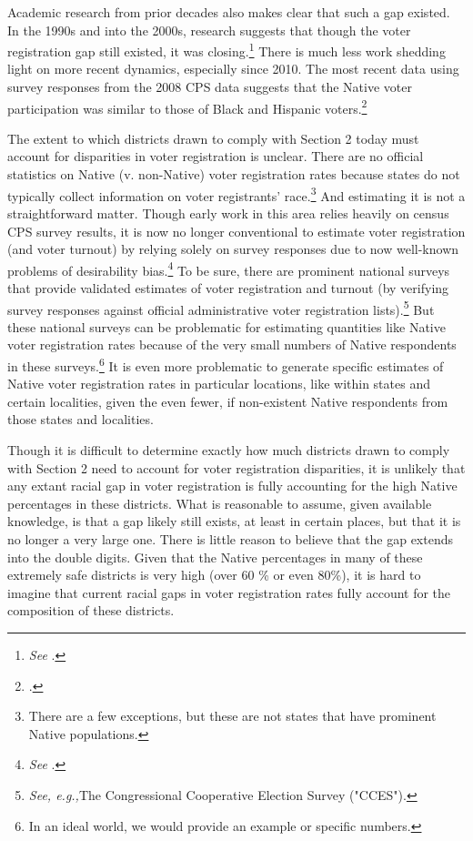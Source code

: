 \documentclass[12pt]{article}
\begin{document}
Academic research from prior decades also makes clear that such a gap existed.  In the 1990s and into the 2000s, research suggests that though the voter registration gap still existed, it was closing.\footnote{\textit{See} \cite{peterson_1997, peterson_1999, stubben_2006, mccool2007native, wang_2012}.}  There is much less work shedding light on more recent dynamics, especially since 2010. The most recent data using survey responses from the 2008 CPS data suggests that the Native voter participation was similar to those of Black and Hispanic voters.\footnote{\cite{huyser_sanchez_vargas_2017}.}

The extent to which districts drawn to comply with Section 2 today must account for disparities in voter registration is unclear. There are no official statistics on Native (v. non-Native) voter registration rates because states do not typically collect information on voter registrants' race.\footnote{There are a few exceptions, but these are not states that have prominent Native populations.} And estimating it is not a straightforward matter. Though early work in this area relies heavily on census CPS survey results, it is now no longer conventional to estimate voter registration (and voter turnout) by relying solely on survey responses due to now well-known problems of desirability bias.\footnote{\textit{See} \cite{ansolabehere_hersh_2012}.} To be sure, there are prominent national surveys that provide validated estimates of voter registration and turnout (by verifying survey responses against official administrative voter registration lists).\footnote{\textit{See, e.g.,}The Congressional Cooperative Election Survey ("CCES").} But these national surveys can be problematic for estimating quantities like Native voter registration rates because of the very small numbers of Native respondents in these surveys.\footnote{In an ideal world, we would provide an example or specific numbers.} It is even more problematic to generate specific estimates of Native voter registration rates in particular locations, like within states and certain localities, given the even fewer, if non-existent Native respondents from those states and localities.

Though it is difficult to determine exactly how much districts drawn to comply with Section 2 need to account for voter registration disparities, it is unlikely that any extant racial gap in voter registration is fully accounting for the high Native percentages in these districts.  What is reasonable to assume, given available knowledge, is that a gap likely still exists, at least in certain places, but that it is no longer a very large one.  There is little reason to believe that the gap extends into the double digits.  Given that the Native percentages in many of these extremely safe districts is very high (over 60 \% or even 80\%), it is hard to imagine that current racial gaps in voter registration rates fully account for the composition of these districts.
\end{document}
